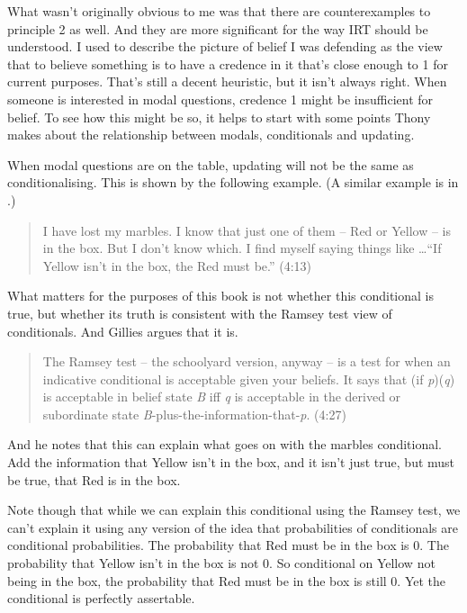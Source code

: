 \documentclass[11pt,]{book}
\begin{document}
What wasn't originally obvious to me was that there are counterexamples to principle 2 as well. And they are more significant for the way IRT should be understood. I used to describe the picture of belief I was defending as the view that to believe something is to have a credence in it that's close enough to 1 for current purposes. That's still a decent heuristic, but it isn't always right. When someone is interested in modal questions, credence 1 might be insufficient for belief. To see how this might be so, it helps to start with some points Thony \citet{Gillies2010} makes about the relationship between modals, conditionals and updating.

When modal questions are on the table, updating will not be the same as conditionalising. This is shown by the following example. (A similar example is in \citet[94]{Kratzer2012}.)

\begin{quote}
I have lost my marbles. I know that just one of them -- Red or Yellow -- is in the box. But I don't know which. I find myself saying things like \ldots{}``If Yellow isn't in the box, the Red must be.'' (4:13)
\end{quote}

What matters for the purposes of this book is not whether this conditional is true, but whether its truth is consistent with the Ramsey test view of conditionals. And Gillies argues that it is.

\begin{quote}
The Ramsey test -- the schoolyard version, anyway -- is a test for when an indicative conditional is acceptable given your beliefs. It says that (if \emph{p})(\emph{q}) is acceptable in belief state \emph{B} iff \emph{q} is acceptable in the derived or subordinate state \emph{B}-plus-the-information-that-\emph{p}. (4:27)
\end{quote}

And he notes that this can explain what goes on with the marbles conditional. Add the information that Yellow isn't in the box, and it isn't just true, but must be true, that Red is in the box.

Note though that while we can explain this conditional using the Ramsey test, we can't explain it using any version of the idea that probabilities of conditionals are conditional probabilities. The probability that Red must be in the box is 0. The probability that Yellow isn't in the box is not 0. So conditional on Yellow not being in the box, the probability that Red must be in the box is still 0. Yet the conditional is perfectly assertable.
\end{document}
